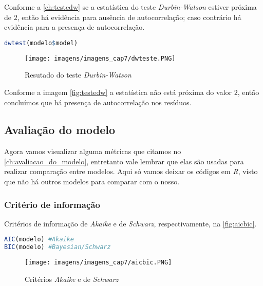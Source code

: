 \noindent Conforme a \autoref{ch:testedw} se a estatística do teste \textit{Durbin-Watson} estiver próxima de $2$, então há evidência para ausência de autocorrelação; caso contrário há evidência para a presença de autocorrelação.

\begin{lstlisting}[language=R, caption = {Teste de autocorrelação},label={lst:code21}]
dwtest(modelo$model)
\end{lstlisting}

\begin{figure}[H]
\centering
\caption{Resutado do teste \textit{Durbin-Watson}}
\texttt{[image: imagens/imagens\_cap7/dwteste.PNG]}
\label{fig:testedw}
\end{figure}

\noindent Conforme a imagem \autoref{fig:testedw} a estatística não está próxima do valor $2$, então concluímos que há presença de autocorrelação nos resíduos.

\newpage

\subsection{Avaliação do modelo}

\noindent Agora vamos visualizar alguma métricas que citamos no \autoref{ch:avaliacao_do_modelo}, entretanto vale lembrar que elas são usadas para realizar comparação entre modelos. Aqui só vamos deixar os códigos em \textit{R}, visto que não há outros modelos para comparar com o nosso.

\subsubsection{Critério de informação}

\noindent Critérios de informação de \textit{Akaike} e de \textit{Schwarz}, respectivamente, na \autoref{fig:aicbic}.

\begin{lstlisting}[language=R, caption = {Critério de informação},label={lst:code22}]
AIC(modelo) #Akaike
BIC(modelo) #Bayesian/Schwarz
\end{lstlisting}

\begin{figure}[H]
\centering
\caption{Critérios \textit{Akaike} e de \textit{Schwarz}}
\texttt{[image: imagens/imagens\_cap7/aicbic.PNG]}
\label{fig:aicbic}
\end{figure}

